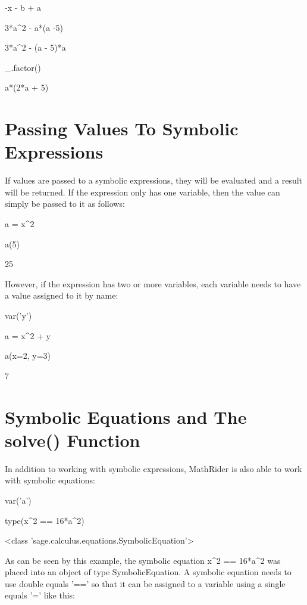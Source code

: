 \documentclass[12pt,oneside]{book}
\begin{document}
{\textbar}

{}-x {}- b + a

3*a\^{}2 {}- a*(a {}-5)

{\textbar}

3*a\^{}2 {}- (a {}- 5)*a

\_.factor()

{\textbar}

a*(2*a + 5)

\section[Passing Values To Symbolic Expressions]{Passing Values To Symbolic Expressions}

If values are passed to a symbolic expressions, they will be evaluated and a result will be returned. If the expression only has one variable, then the value can simply be passed to it as follows: 

a = x\^{}2

a(5)

{\textbar}

25

However, if the expression has two or more variables, each variable needs to have a value assigned to it by name: 

var('y')

a = x\^{}2 + y

a(x=2, y=3)

{\textbar}

7

\section[Symbolic Equations and The solve() Function]{Symbolic Equations and The solve() Function}

In addition to working with symbolic expressions, MathRider is also able to work with symbolic equations: 

var('a')

type(x\^{}2 == 16*a\^{}2)

{\textbar}

{\textless}class 'sage.calculus.equations.SymbolicEquation'{\textgreater}

As can be seen by this example, the symbolic equation x\^{}2 == 16*a\^{}2 was placed into an object of type SymbolicEquation. A symbolic equation needs to use double equals '==' so that it can be assigned to a variable using a single equals '=' like this: 
\end{document}
